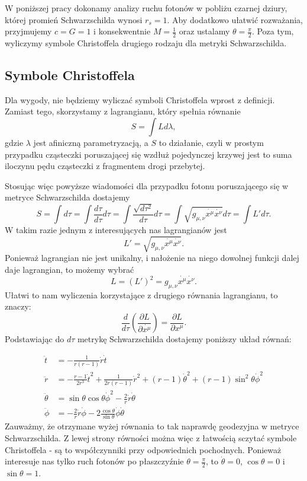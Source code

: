 W poniższej pracy dokonamy analizy ruchu fotonów w pobliżu czarnej dziury, której promień Schwarzschilda wynosi $r_s=1$. Aby dodatkowo ułatwić rozważania, przyjmujemy $c=G=1$ i konsekwentnie $M=\frac{1}{2}$ oraz ustalamy $\theta=\frac{\pi}{2}$. Poza tym, wyliczymy symbole Christoffela drugiego rodzaju dla metryki Schwarzschilda.

\subsection{Symbole Christoffela}

Dla wygody, nie będziemy wyliczać symboli Christoffela wprost z definicji. Zamiast tego, skorzystamy z lagrangianu, który spełnia równanie
$$ S = \int L d \lambda, $$
gdzie $\lambda$ jest afiniczną parametryzacją, a $S$ to działanie, czyli w prostym przypadku cząsteczki poruszającej się wzdłuż pojedynczej krzywej jest to suma iloczynu pędu cząsteczki z fragmentem drogi przebytej. 

Stosując więc powyższe wiadomości dla przypadku fotonu poruszającego się w metryce Schwarzschilda dostajemy
$$ S = \int d \tau= \int \frac{d \tau}{d \tau} d \tau = \int \frac{\sqrt{d \tau^2}}{d \tau} d \tau = \int \sqrt{g_{\mu, \nu}\dot{x^\mu} \dot{x^\nu}}d \tau = \int L' d \tau. $$
W takim razie jednym z interesujących nas lagrangianów jest 
$$L'=\sqrt{g_{\mu, \nu}\dot{x^\mu}\dot{x^\nu}}.$$ 
Ponieważ lagrangian nie jest unikalny, i nałożenie na niego dowolnej funkcji dalej daje lagrangian, to możemy wybrać
$$L=(L')^2 = g_{\mu,\nu}\dot{x^\mu}\dot{x^\nu}.$$
Ułatwi to nam wyliczenia korzystające z drugiego równania lagrangianu, to znaczy:
$$\frac{d}{ d \tau}\left(\frac{\partial L}{\partial \dot{x^\mu}}\right)= \frac{\partial L}{\partial x^\mu}. $$
Podstawiając do $d \tau$ metrykę Schwarzschilda dostajemy poniższy układ równań:

\begin{align*}
  \ddot{t}&=-\frac{1}{r(r-1)}\dot{r}\dot{t}\\
  \ddot{r}&=-\frac{r-1}{ 2r^3} \dot{t}^2+\frac{1}{2r(r-1)}\dot{r}^2+(r-1)\dot{\theta}^2+(r-1)\sin^2\theta \dot{\phi}^2\\
  \ddot{\theta} &= \sin \theta \cos \theta \dot{\phi}^2 - \frac{2}{ r} \dot{r}\dot{\theta}\\
  \ddot{\phi} &= -\frac{2}{r} \dot{r}\dot{\phi} - 2 \frac{\cos \theta}{ \sin \theta} \dot{\phi}  \dot{\theta} 
\end{align*}
Zauważmy, że otrzymane wyżej równania to tak naprawdę geodezyjna w metryce Schwarzschilda. Z lewej strony równości można więc z łatwością sczytać symbole Christoffela - są to współczynniki przy odpowiednich pochodnych. Ponieważ interesuje nas tylko ruch fotonów po płaszczyźnie $\theta=\frac{\pi}{2}$, to $\dot{\theta}=0$, $\cos \theta=0$ i $\sin \theta=1$.

